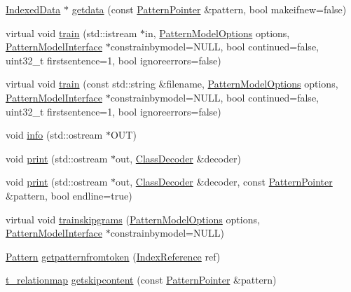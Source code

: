 \begin{DoxyCompactItemize}
\item 
\hyperlink{classIndexedData}{Indexed\+Data} $\ast$ \hyperlink{classIndexedPatternModel_ac5a8ebe51c1a999a06c97ffc34d58401}{getdata} (const \hyperlink{classPatternPointer}{Pattern\+Pointer} \&pattern, bool makeifnew=false)
\item 
virtual void \hyperlink{classIndexedPatternModel_ad416961213cc18e4c4a3d9f9e71d445e}{train} (std\+::istream $\ast$in, \hyperlink{classPatternModelOptions}{Pattern\+Model\+Options} options, \hyperlink{classPatternModelInterface}{Pattern\+Model\+Interface} $\ast$constrainbymodel=N\+U\+L\+L, bool continued=false, uint32\+\_\+t firstsentence=1, bool ignoreerrors=false)
\item 
virtual void \hyperlink{classIndexedPatternModel_a22f094eef93f4afbfed7697724975220}{train} (const std\+::string \&filename, \hyperlink{classPatternModelOptions}{Pattern\+Model\+Options} options, \hyperlink{classPatternModelInterface}{Pattern\+Model\+Interface} $\ast$constrainbymodel=N\+U\+L\+L, bool continued=false, uint32\+\_\+t firstsentence=1, bool ignoreerrors=false)
\item 
void \hyperlink{classIndexedPatternModel_a4fb359f3059ee9689494fd053ce4adba}{info} (std\+::ostream $\ast$O\+U\+T)
\item 
void \hyperlink{classIndexedPatternModel_ab139c59cacc6cabe5f1004c741feb9f6}{print} (std\+::ostream $\ast$out, \hyperlink{classClassDecoder}{Class\+Decoder} \&decoder)
\item 
void \hyperlink{classIndexedPatternModel_a3a2833e7343e15d7079ca40fe0d13652}{print} (std\+::ostream $\ast$out, \hyperlink{classClassDecoder}{Class\+Decoder} \&decoder, const \hyperlink{classPatternPointer}{Pattern\+Pointer} \&pattern, bool endline=true)
\item 
virtual void \hyperlink{classIndexedPatternModel_a0bd2f75e24f53a70170468bb1dc4caaf}{trainskipgrams} (\hyperlink{classPatternModelOptions}{Pattern\+Model\+Options} options, \hyperlink{classPatternModelInterface}{Pattern\+Model\+Interface} $\ast$constrainbymodel=N\+U\+L\+L)
\item 
\hyperlink{classPattern}{Pattern} \hyperlink{classIndexedPatternModel_a107afd39015a4dc4ebaa6501d38945e6}{getpatternfromtoken} (\hyperlink{classIndexReference}{Index\+Reference} ref)
\item 
\hyperlink{patternmodel_8h_a8695a2b10be5a74c827cd6c11bd46fb9}{t\+\_\+relationmap} \hyperlink{classIndexedPatternModel_a5dfb36835fbf8c1f0aed894217838c78}{getskipcontent} (const \hyperlink{classPatternPointer}{Pattern\+Pointer} \&pattern)

\end{DoxyCompactItemize}
